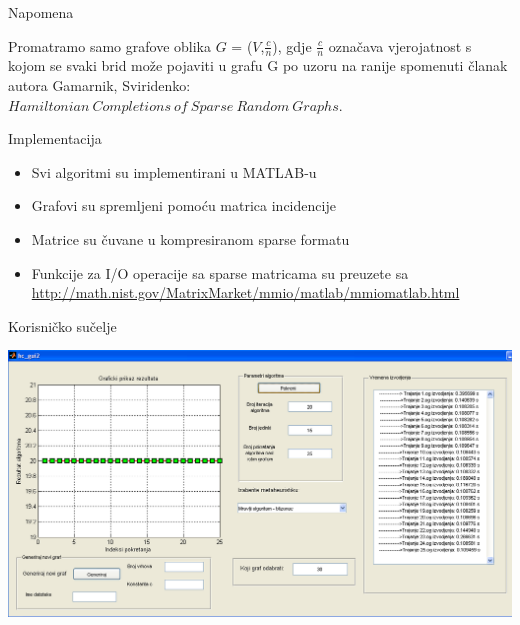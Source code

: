 \documentclass{beamer}
\begin{document}
\begin{frame}{Napomena}

Promatramo samo grafove oblika $G$ = ($V$,$\frac{c} {n}$), gdje $\frac{c} {n}$ ozna\v{c}ava vjerojatnost s kojom se svaki brid mo\v{z}e pojaviti u grafu G po uzoru na ranije spomenuti članak autora Gamarnik, Sviridenko: $Hamiltonian\:Completions\:of\:Sparse\:Random\:Graphs$.

\end{frame}
\begin{frame}{Implementacija}
\begin{itemize}
\item Svi algoritmi su implementirani u MATLAB-u\\
\item Grafovi su spremljeni pomoću matrica incidencije\\
\item Matrice su čuvane u kompresiranom sparse formatu\\
\item Funkcije za I/O operacije sa sparse matricama su preuzete sa \url{http://math.nist.gov/MatrixMarket/mmio/matlab/mmiomatlab.html}\\ 
\end{itemize}
\end{frame}

\begin{frame}{Korisni\v{c}ko su\v{c}elje}
\begin{center}
\includegraphics[scale = 0.28]{gui.png}
\end{center}
\end{frame}
\end{document}
